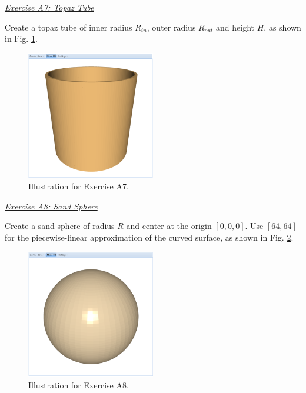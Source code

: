 \documentclass[article,A4,12pt]{llncs}
\begin{document}
\noindent
\underline{\em Exercise A7: Topaz Tube}

Create a topaz tube of inner radius $R_{in}$, outer radius $R_{out}$
and height $H$, as shown in Fig. \ref{fig:a7}.

\newpage

\begin{figure}[!ht]
\begin{center}
\includegraphics[width=0.5\textwidth]{img/a7-topaz-tube.png}
\end{center}
\vspace{-2mm}
\caption{Illustration for Exercise A7.}
\label{fig:a7}
\end{figure}


\noindent
\underline{\em Exercise A8: Sand Sphere}

Create a sand sphere of radius $R$ and center at the origin $[0, 0, 0]$. 
Use $[64, 64]$ for the piecewise-linear approximation of the curved surface, 
as shown in Fig. \ref{fig:a8}.

\newpage

\begin{figure}[!ht]
\begin{center}
\includegraphics[width=0.5\textwidth]{img/a8-sand-sphere.png}
\end{center}
\vspace{-2mm}
\caption{Illustration for Exercise A8.}
\label{fig:a8}
\end{figure}
\end{document}
